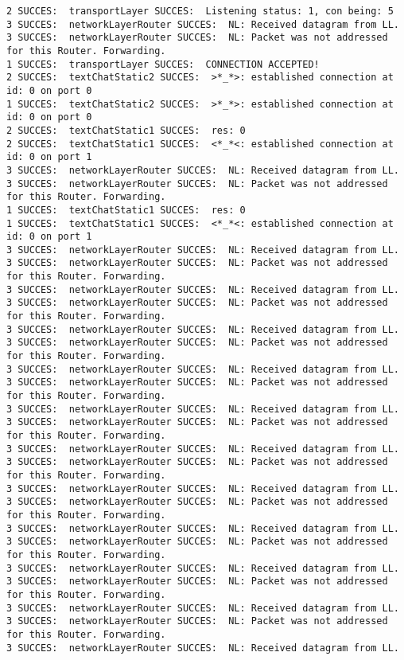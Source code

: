 \begin{lstlisting}[breaklines=true]
2 SUCCES:  transportLayer SUCCES:  Listening status: 1, con being: 5
3 SUCCES:  networkLayerRouter SUCCES:  NL: Received datagram from LL.
3 SUCCES:  networkLayerRouter SUCCES:  NL: Packet was not addressed for this Router. Forwarding.
1 SUCCES:  transportLayer SUCCES:  CONNECTION ACCEPTED!
2 SUCCES:  textChatStatic2 SUCCES:  >*_*>: established connection at id: 0 on port 0
1 SUCCES:  textChatStatic2 SUCCES:  >*_*>: established connection at id: 0 on port 0
2 SUCCES:  textChatStatic1 SUCCES:  res: 0
2 SUCCES:  textChatStatic1 SUCCES:  <*_*<: established connection at id: 0 on port 1
3 SUCCES:  networkLayerRouter SUCCES:  NL: Received datagram from LL.
3 SUCCES:  networkLayerRouter SUCCES:  NL: Packet was not addressed for this Router. Forwarding.
1 SUCCES:  textChatStatic1 SUCCES:  res: 0
1 SUCCES:  textChatStatic1 SUCCES:  <*_*<: established connection at id: 0 on port 1
3 SUCCES:  networkLayerRouter SUCCES:  NL: Received datagram from LL.
3 SUCCES:  networkLayerRouter SUCCES:  NL: Packet was not addressed for this Router. Forwarding.
3 SUCCES:  networkLayerRouter SUCCES:  NL: Received datagram from LL.
3 SUCCES:  networkLayerRouter SUCCES:  NL: Packet was not addressed for this Router. Forwarding.
3 SUCCES:  networkLayerRouter SUCCES:  NL: Received datagram from LL.
3 SUCCES:  networkLayerRouter SUCCES:  NL: Packet was not addressed for this Router. Forwarding.
3 SUCCES:  networkLayerRouter SUCCES:  NL: Received datagram from LL.
3 SUCCES:  networkLayerRouter SUCCES:  NL: Packet was not addressed for this Router. Forwarding.
3 SUCCES:  networkLayerRouter SUCCES:  NL: Received datagram from LL.
3 SUCCES:  networkLayerRouter SUCCES:  NL: Packet was not addressed for this Router. Forwarding.
3 SUCCES:  networkLayerRouter SUCCES:  NL: Received datagram from LL.
3 SUCCES:  networkLayerRouter SUCCES:  NL: Packet was not addressed for this Router. Forwarding.
3 SUCCES:  networkLayerRouter SUCCES:  NL: Received datagram from LL.
3 SUCCES:  networkLayerRouter SUCCES:  NL: Packet was not addressed for this Router. Forwarding.
3 SUCCES:  networkLayerRouter SUCCES:  NL: Received datagram from LL.
3 SUCCES:  networkLayerRouter SUCCES:  NL: Packet was not addressed for this Router. Forwarding.
3 SUCCES:  networkLayerRouter SUCCES:  NL: Received datagram from LL.
3 SUCCES:  networkLayerRouter SUCCES:  NL: Packet was not addressed for this Router. Forwarding.
3 SUCCES:  networkLayerRouter SUCCES:  NL: Received datagram from LL.
3 SUCCES:  networkLayerRouter SUCCES:  NL: Packet was not addressed for this Router. Forwarding.
3 SUCCES:  networkLayerRouter SUCCES:  NL: Received datagram from LL.

\end{lstlisting}
